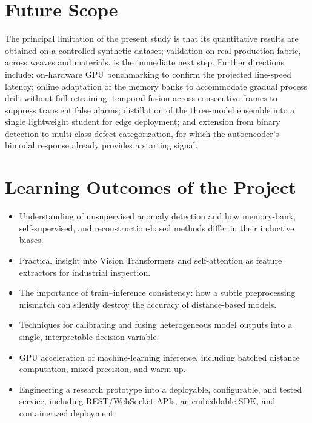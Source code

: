\section{Future Scope}

The principal limitation of the present study is that its quantitative results are obtained on a controlled synthetic dataset; validation on real production fabric, across weaves and materials, is the immediate next step. Further directions include: on-hardware GPU benchmarking to confirm the projected line-speed latency; online adaptation of the memory banks to accommodate gradual process drift without full retraining; temporal fusion across consecutive frames to suppress transient false alarms; distillation of the three-model ensemble into a single lightweight student for edge deployment; and extension from binary detection to multi-class defect categorization, for which the autoencoder's bimodal response already provides a starting signal.

\section{Learning Outcomes of the Project}
\begin{itemize}
\item Understanding of unsupervised anomaly detection and how memory-bank, self-supervised, and reconstruction-based methods differ in their inductive biases.
\item Practical insight into Vision Transformers and self-attention as feature extractors for industrial inspection.
\item The importance of train--inference consistency: how a subtle preprocessing mismatch can silently destroy the accuracy of distance-based models.
\item Techniques for calibrating and fusing heterogeneous model outputs into a single, interpretable decision variable.
\item GPU acceleration of machine-learning inference, including batched distance computation, mixed precision, and warm-up.
\item Engineering a research prototype into a deployable, configurable, and tested service, including REST/WebSocket APIs, an embeddable SDK, and containerized deployment.
\end{itemize}
